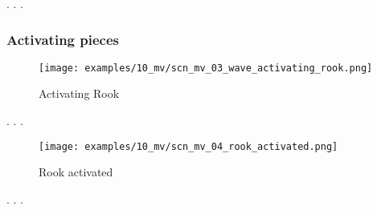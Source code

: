 . . .


\clearpage %

\subsubsection*{Activating pieces}

\vspace*{-1.4\baselineskip}
\noindent
\begin{figure}[!h]
\texttt{[image: examples/10\_mv/scn\_mv\_03\_wave\_activating\_rook.png]}
\caption{Activating Rook}
\label{fig:scn_mv_03_wave_activating_rook}
\end{figure}

. . .


\clearpage %

\vspace*{-2.1\baselineskip}
\noindent
\begin{figure}[!h]
\texttt{[image: examples/10\_mv/scn\_mv\_04\_rook\_activated.png]}
\caption{Rook activated}
\label{fig:scn_mv_04_rook_activated}
\end{figure}

. . .













